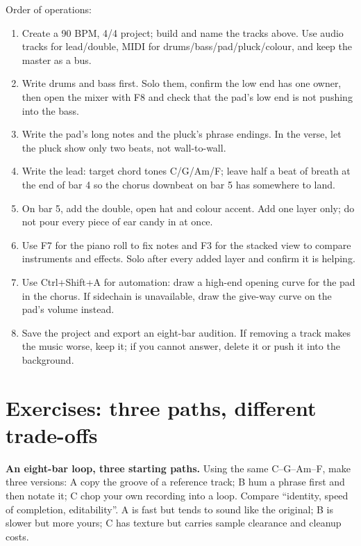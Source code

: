 Order of operations:

\begin{sloppypar}
\begin{enumerate}
\item Create a 90 BPM, 4/4 project; build and name the tracks above. Use audio tracks for lead/double, MIDI for drums/bass/pad/pluck/colour, and keep the master as a bus.
\item Write drums and bass first. Solo them, confirm the low end has one owner, then open the mixer with F8 and check that the pad's low end is not pushing into the bass.
\item Write the pad's long notes and the pluck's phrase endings. In the verse, let the pluck show only two beats, not wall-to-wall.
\item Write the lead: target chord tones C/G/Am/F; leave half a beat of breath at the end of bar 4 so the chorus downbeat on bar 5 has somewhere to land.
\item On bar 5, add the double, open hat and colour accent. Add one layer only; do not pour every piece of ear candy in at once.
\item Use F7 for the piano roll to fix notes and F3 for the stacked view to compare instruments and effects. Solo after every added layer and confirm it is helping.
\item Use Ctrl+Shift+A for automation: draw a high-end opening curve for the pad in the chorus. If sidechain is unavailable, draw the give-way curve on the pad's volume instead.
\item Save the project and export an eight-bar audition. If removing a track makes the music worse, keep it; if you cannot answer, delete it or push it into the background.
\end{enumerate}
\end{sloppypar}

\section{Exercises: three paths, different trade-offs}
\label{sec:pop-practice}

\begin{exercise}
\textbf{An eight-bar loop, three starting paths.} Using the same C--G--Am--F, make three versions: A copy the groove of a reference track; B hum a phrase first and then notate it; C chop your own recording into a loop. Compare ``identity, speed of completion, editability''. A is fast but tends to sound like the original; B is slower but more yours; C has texture but carries sample clearance and cleanup costs.
\end{exercise}

